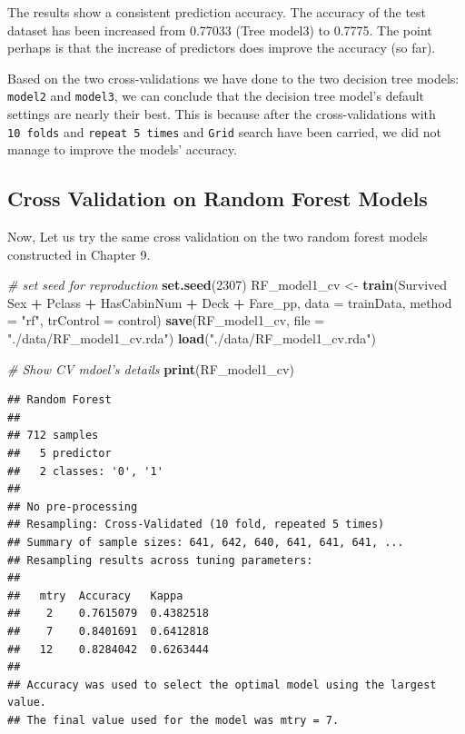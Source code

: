 \documentclass[
]{book}
\newenvironment{Shaded}{\begin{snugshade}}{\end{snugshade}}
\newcommand{\CommentTok}[1]{\textcolor[rgb]{0.56,0.35,0.01}{\textit{#1}}}
\newcommand{\DataTypeTok}[1]{\textcolor[rgb]{0.13,0.29,0.53}{#1}}
\newcommand{\DecValTok}[1]{\textcolor[rgb]{0.00,0.00,0.81}{#1}}
\newcommand{\KeywordTok}[1]{\textcolor[rgb]{0.13,0.29,0.53}{\textbf{#1}}}
\newcommand{\NormalTok}[1]{#1}
\newcommand{\OperatorTok}[1]{\textcolor[rgb]{0.81,0.36,0.00}{\textbf{#1}}}
\newcommand{\StringTok}[1]{\textcolor[rgb]{0.31,0.60,0.02}{#1}}
\begin{document}
The results show a consistent prediction accuracy. The accuracy of the test dataset has been increased from 0.77033 (Tree model3) to 0.7775. The point perhaps is that the increase of predictors does improve the accuracy (so far).

Based on the two cross-validations we have done to the two decision tree models: \texttt{model2} and \texttt{model3}, we can conclude that the decision tree model's default settings are nearly their best. This is because after the cross-validations with \texttt{10\ folds} and \texttt{repeat\ 5\ times} and \texttt{Grid} search have been carried, we did not manage to improve the models' accuracy.

\hypertarget{cross-validation-on-random-forest-models}{%
\subsection*{Cross Validation on Random Forest Models}\label{cross-validation-on-random-forest-models}}


Now, Let us try the same cross validation on the two random forest models constructed in Chapter 9.

\begin{Shaded}
\begin{Highlighting}[]
\CommentTok{# set seed for reproduction}
\KeywordTok{set.seed}\NormalTok{(}\DecValTok{2307}\NormalTok{)}
\NormalTok{RF_model1_cv <-}\StringTok{ }\KeywordTok{train}\NormalTok{(Survived }\OperatorTok{~}\StringTok{ }\NormalTok{Sex }\OperatorTok{+}\StringTok{ }\NormalTok{Pclass }\OperatorTok{+}\StringTok{ }\NormalTok{HasCabinNum }\OperatorTok{+}\StringTok{      }\NormalTok{Deck }\OperatorTok{+}\StringTok{ }\NormalTok{Fare_pp,}
                       \DataTypeTok{data =}\NormalTok{ trainData,}
                       \DataTypeTok{method =} \StringTok{"rf"}\NormalTok{,}
                       \DataTypeTok{trControl =}\NormalTok{ control)}
\KeywordTok{save}\NormalTok{(RF_model1_cv, }\DataTypeTok{file =} \StringTok{"./data/RF_model1_cv.rda"}\NormalTok{)}
\KeywordTok{load}\NormalTok{(}\StringTok{"./data/RF_model1_cv.rda"}\NormalTok{)}

\CommentTok{# Show CV mdoel's details}
\KeywordTok{print}\NormalTok{(RF_model1_cv)}
\end{Highlighting}
\end{Shaded}

\begin{verbatim}
## Random Forest 
## 
## 712 samples
##   5 predictor
##   2 classes: '0', '1' 
## 
## No pre-processing
## Resampling: Cross-Validated (10 fold, repeated 5 times) 
## Summary of sample sizes: 641, 642, 640, 641, 641, 641, ... 
## Resampling results across tuning parameters:
## 
##   mtry  Accuracy   Kappa    
##    2    0.7615079  0.4382518
##    7    0.8401691  0.6412818
##   12    0.8284042  0.6263444
## 
## Accuracy was used to select the optimal model using the largest value.
## The final value used for the model was mtry = 7.
\end{verbatim}
\end{document}
